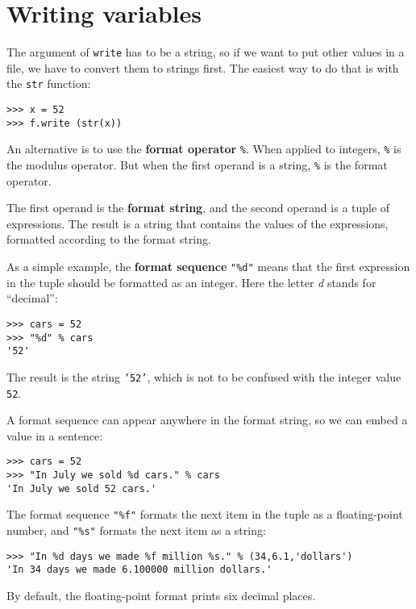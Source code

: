 \section{Writing variables}

The argument of {\tt write} has to be a string, so if we want
to put other values in a file, we have to convert them to
strings first.  The easiest way to do that is with the {\tt str}
function:

\beforeverb
\begin{verbatim}
>>> x = 52
>>> f.write (str(x))
\end{verbatim}
\afterverb
%
An alternative is to use the {\bf format operator} {\tt \%}.  When
applied to integers, {\tt \%} is the modulus operator.  But
when the first operand is a string, {\tt \%} is the format operator.

The first operand is the {\bf format string}, and the second operand
is a tuple of expressions.  The result is a string that contains
the values of the expressions, formatted according to the format
string.

As a simple example, the {\bf format sequence} {\tt "\%d"} means that
the first expression in the tuple should be formatted as an
integer.  Here the letter {\em d} stands for ``decimal'':

\beforeverb
\begin{verbatim}
>>> cars = 52
>>> "%d" % cars
'52'
\end{verbatim}
\afterverb
%
The result is the string {\tt '52'}, which is not to be confused
with the integer value {\tt 52}.

A format sequence can appear anywhere in the format string,
so we can embed a value in a sentence:

\beforeverb
\begin{verbatim}
>>> cars = 52
>>> "In July we sold %d cars." % cars
'In July we sold 52 cars.'
\end{verbatim}
\afterverb
%
The format sequence {\tt "\%f"} formats the next item in
the tuple as a floating-point number, and {\tt "\%s"} formats
the next item as a string:

\beforeverb
\begin{verbatim}
>>> "In %d days we made %f million %s." % (34,6.1,'dollars')
'In 34 days we made 6.100000 million dollars.'
\end{verbatim}
\afterverb
%
By default, the floating-point format prints six decimal places.

